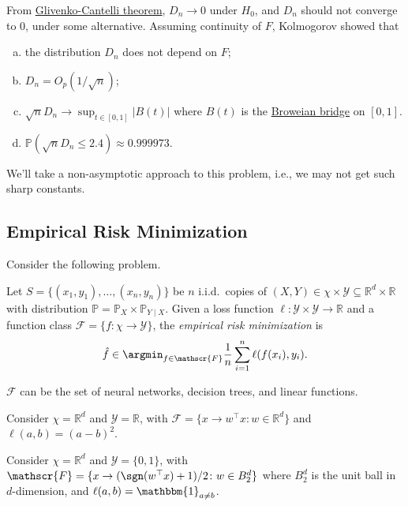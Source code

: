 From \href{https://en.wikipedia.org/wiki/Glivenko-Cantelli_theorem}{Glivenko-Cantelli theorem}, \(D_n \to 0\) under \(H_0\), and \(D_n\) should not converge to \(0\), under some alternative. Assuming continuity of \(F\), Kolmogorov showed that
\begin{enumerate}[(a)]
	\item the distribution \(D_n\) does not depend on \(F\);
	\item \(D_n = O_p(1 / \sqrt{n} )\);
	\item \(\sqrt{n} D_n \to \sup _{t\in [0, 1]} \vert B(t) \vert \) where \(B(t)\) is the \href{https://en.wikipedia.org/wiki/Brownian_bridge}{Broweian bridge} on \([0, 1]\).
	\item \(\mathbb{P} (\sqrt{n}D_n  \leq 2.4) \approx 0.999973\).
\end{enumerate}
We'll take a non-asymptotic approach to this problem, i.e., we may not get such sharp constants.

\subsection{Empirical Risk Minimization}
Consider the following problem.

\begin{problem}\label{prb:ERM}
Let \(S = \{ (x_1, y_1) , \dots , (x_n, y_n)\} \) be \(n\) i.i.d.\ copies of \((X, Y) \in \chi \times \mathscr{Y} \subseteq \mathbb{R} ^d\times \mathbb{R}\) with distribution \(\mathbb{P} = \mathbb{P} _X \times \mathbb{P} _{Y \mid X}\). Given a loss function \(\ell \colon \mathscr{Y} \times \mathscr{Y} \to \mathbb{R}\) and a function class \(\mathscr{F} = \{ f\colon \chi \to \mathscr{Y}  \} \), the \emph{empirical risk minimization} is
\[
	\hat{f} \in \argmin_{f\in \mathscr{F} } \frac{1}{n}\sum_{i=1}^{n} \ell (f(x_i), y_i).
\]
\end{problem}

\begin{eg}
	\(\mathscr{F} \) can be the set of neural networks, decision trees, and linear functions.
\end{eg}

\begin{eg}
	Consider \(\chi = \mathbb{R} ^d\) and \(\mathscr{Y} = \mathbb{R} \), with \(\mathscr{F} = \{ x \to w^{\top} x \colon w\in \mathbb{R} ^d \} \) and \(\ell (a, b) = (a - b)^2\).
\end{eg}

\begin{eg}
	Consider \(\chi = \mathbb{R} ^d\) and \(\mathscr{Y} = \{ 0, 1 \} \), with \(\mathscr{F} = \{ x \to (\sgn (w^{\top} x ) + 1)/ 2 \colon w\in B_2^d \}\) where \(B_2^d\) is the unit ball in \(d\)-dimension, and \(\ell (a, b) = \mathbbm{1}_{a \neq b} \).
\end{eg}

